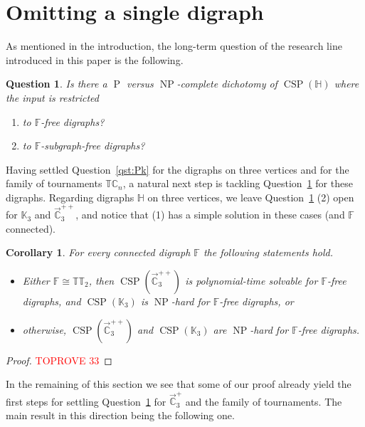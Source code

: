 \documentclass{article}
\newtheorem{corollary}[theorem]{Corollary}
\newtheorem{question}{Question}
\theoremstyle{definition}
\theoremstyle{remark}
\DeclareMathOperator{\NP}{NP}
\DeclareMathOperator{\cP}{P}
\DeclareMathOperator{\CSP}{CSP}
\newcommand{\bC}{{\mathbb C}}
\newcommand{\bF}{{\mathbb F}}
\newcommand{\bH}{{\mathbb H}}
\newcommand{\bK}{{\mathbb K}}
\newcommand{\bT}{{\mathbb T}}
\begin{document}
\section{Omitting a single digraph}
\label{sect:single-digraph}

As mentioned in the introduction, the long-term question of the research line introduced in 
this paper is the following.

\begin{question}\label{qst:long-term}
    Is there a $\cP$ versus $\NP$-complete dichotomy of $\CSP(\bH)$ where the input
    is restricted 
    \begin{enumerate}
        \item to $\bF$-free digraphs?
        \item to $\bF$-subgraph-free digraphs?
    \end{enumerate}
\end{question}

Having settled  Question~\ref{qst:Pk} for the digraphs on three vertices
and for the family of tournaments $\bT\bC_n$, a natural next step
is tackling Question~\ref{qst:long-term} for these digraphs.
Regarding digraphs $\bH$ on three vertices, we leave Question~\ref{qst:long-term} (2) 
open for $\bK_3$ and $\vec{\bC}_3^{++}$, and notice that (1) has a simple solution in
these cases (and $\bF$ connected). 



\begin{corollary}
    For every connected digraph $\bF$ the following statements hold.
    \begin{itemize}
        \item Either $\bF \cong \bT\bT_2$, then $\CSP(\vec{\bC}_3^{++})$ is polynomial-time solvable
        for $\bF$-free digraphs, and $\CSP(\bK_3)$ is $\NP$-hard for $\bF$-free digraphs, or
        \item otherwise, $\CSP(\vec{\bC}_3^{++})$ and $\CSP(\bK_3)$ are $\NP$-hard for 
        $\bF$-free digraphs. 
    \end{itemize}
\end{corollary}
\begin{proof}\textcolor{red}{TOPROVE 33}\end{proof}




In the remaining of this section we see that some of our proof already yield the first steps 
for settling Question~\ref{qst:long-term} for $\vec{\bC}_3^+$ and the family of tournaments.
The main result in this direction being the following one. 
\end{document}
